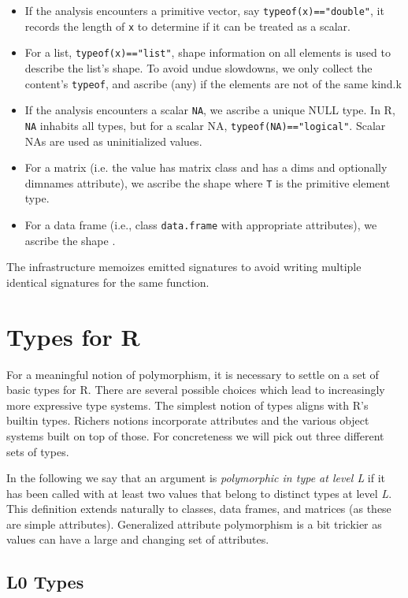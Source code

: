 \documentclass[acmsmall,10pt,review,anonymous]{acmart}\settopmatter{printfolios=true,printccs=false,printacmref=false}
\newcommand{\code}[1]{\lstinline|#1|\xspace}
\begin{document}
\begin{itemize}
\item If the analysis encounters a primitive vector, say
  \code{typeof(x)=="double"}, it records the length of {\tt x} to determine
  if it can be treated as a scalar.
\item For a list, \code{typeof(x)=="list"}, shape information on all
  elements is used to describe the list's shape.  To avoid undue slowdowns,
  we only collect the content's \code{typeof}, and ascribe \ANY (any) if the
  elements are not of the same kind.k
\item If the analysis encounters a scalar \code{NA}, we ascribe a unique
  NULL type.  In R, \code{NA} inhabits all types, but for a scalar NA,
  \code{typeof(NA)=="logical"}. Scalar NAs are used as uninitialized values.
\item For a matrix (i.e. the value has matrix class and has a dims and
  optionally dimnames attribute), we ascribe the shape 
  where {\tt T} is the primitive element type.
\item For a data frame (i.e., class {\tt data.frame} with appropriate
  attributes), we ascribe the shape .
\end{itemize}

The infrastructure memoizes emitted signatures to avoid writing multiple
identical signatures for the same function.

\section{Types for R}

For a meaningful notion of polymorphism, it is necessary to settle on a set
of basic types for R. There are several possible choices which lead to
increasingly more expressive type systems. The simplest notion of types
aligns with R's builtin types. Richers notions incorporate attributes and
the various object systems built on top of those. For concreteness we will
pick out three different sets of types.

In the following we say that an argument is {\it polymorphic in type at
  level L} if it has been called with at least two values that belong to
distinct types at level \emph{L}. This definition extends naturally to
classes, data frames, and matrices (as these are simple attributes).
Generalized attribute polymorphism is a bit trickier as values can have a
large and changing set of attributes.

\subsection{L0 Types}
\end{document}
